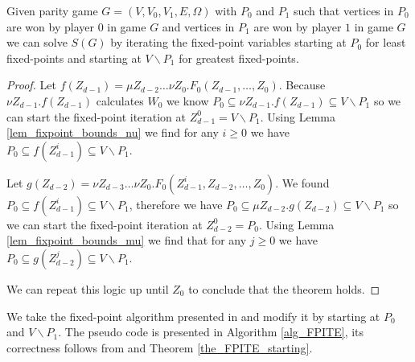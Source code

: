 \begin{theorem}
	\label{the_FPITE_starting}
	Given parity game $G = (V,V_0,V_1,E,\Omega)$ with $P_0$ and $P_1$ such that vertices  in $P_0$ are won by player $0$ in game $G$ and vertices in $P_1$ are won by player $1$ in game $G$ we can solve $S(G)$ by iterating the fixed-point variables starting at $P_0$ for least fixed-points and starting at $V \backslash P_1$ for greatest fixed-points.
	\begin{proof}
		Let $f(Z_{d-1}) = \mu Z_{d-2}\dots\nu Z_0.F_0(Z_{d-1},\dots,Z_0)$. Because $\nu Z_{d-1}.f(Z_{d-1})$ calculates $W_0$ we know $P_0 \subseteq \nu Z_{d-1}.f(Z_{d-1}) \subseteq V \backslash P_1$ so we can start the fixed-point iteration at $Z_{d-1}^0 = V\backslash P_1$. Using Lemma \ref{lem_fixpoint_bounds_nu} we find for any $i \geq 0$ we have $P_0 \subseteq f(Z_{d-1}^i) \subseteq V \backslash P_1$.
		
		Let $g(Z_{d-2}) = \nu Z_{d-3} \dots \nu Z_0. F_0(Z_{d-1}^i,Z_{d-2},\dots,Z_0)$. We found $P_0 \subseteq f(Z_{d-1}^i) \subseteq V \backslash P_1$, therefore we have $P_0 \subseteq \mu Z_{d-2}.g(Z_{d-2})\subseteq V \backslash P_1$ so we can start the fixed-point iteration at $Z_{d-2}^0 = P_0$. Using Lemma \ref{lem_fixpoint_bounds_mu} we find that for any $j \geq 0$ we have $P_0 \subseteq g(Z_{d-2}^j) \subseteq V\backslash P_1$.
		
		We can repeat this logic up until $Z_0$ to conclude that the theorem holds.
	\end{proof}
\end{theorem}
We take the fixed-point algorithm presented in \cite{FPITE} and modify it by starting at $P_0$ and $V \backslash P_1$. The pseudo code is presented in Algorithm \ref{alg_FPITE}, its correctness follows from \cite{FPITE} and Theorem \ref{the_FPITE_starting}.
